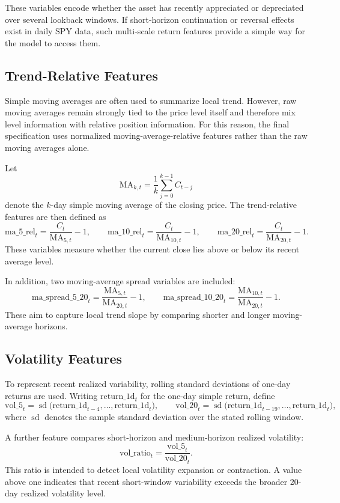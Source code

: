 \documentclass[11pt,a4paper]{article}
\begin{document}
	These variables encode whether the asset has recently appreciated or depreciated over several lookback windows. If short-horizon continuation or reversal effects exist in daily SPY data, such multi-scale return features provide a simple way for the model to access them.
	
	\subsection{Trend-Relative Features}
	
	Simple moving averages are often used to summarize local trend. However, raw moving averages remain strongly tied to the price level itself and therefore mix level information with relative position information. For this reason, the final specification uses normalized moving-average-relative features rather than the raw moving averages alone.
	
	Let
	\[
	\text{MA}_{k,t} = \frac{1}{k}\sum_{j=0}^{k-1} C_{t-j}
	\]
	denote the \(k\)-day simple moving average of the closing price. The trend-relative features are then defined as
	\[
	\text{ma\_5\_rel}_t = \frac{C_t}{\text{MA}_{5,t}} - 1,
	\qquad
	\text{ma\_10\_rel}_t = \frac{C_t}{\text{MA}_{10,t}} - 1,
	\qquad
	\text{ma\_20\_rel}_t = \frac{C_t}{\text{MA}_{20,t}} - 1.
	\]
	These variables measure whether the current close lies above or below its recent average level.
	
	In addition, two moving-average spread variables are included:
	\[
	\text{ma\_spread\_5\_20}_t = \frac{\text{MA}_{5,t}}{\text{MA}_{20,t}} - 1,
	\qquad
	\text{ma\_spread\_10\_20}_t = \frac{\text{MA}_{10,t}}{\text{MA}_{20,t}} - 1.
	\]
	These aim to capture local trend slope by comparing shorter and longer moving-average horizons.
	
	\subsection{Volatility Features}
	
	To represent recent realized variability, rolling standard deviations of one-day returns are used. Writing \(\text{return\_1d}_t\) for the one-day simple return, define
	\[
	\text{vol\_5}_t = \operatorname{sd}\!\big(\text{return\_1d}_{t-4},\dots,\text{return\_1d}_{t}\big),
	\qquad
	\text{vol\_20}_t = \operatorname{sd}\!\big(\text{return\_1d}_{t-19},\dots,\text{return\_1d}_{t}\big),
	\]
	where \(\operatorname{sd}\) denotes the sample standard deviation over the stated rolling window.
	
	A further feature compares short-horizon and medium-horizon realized volatility:
	\[
	\text{vol\_ratio}_t = \frac{\text{vol\_5}_t}{\text{vol\_20}_t}.
	\]
	This ratio is intended to detect local volatility expansion or contraction. A value above one indicates that recent short-window variability exceeds the broader 20-day realized volatility level.
	
\end{document}
